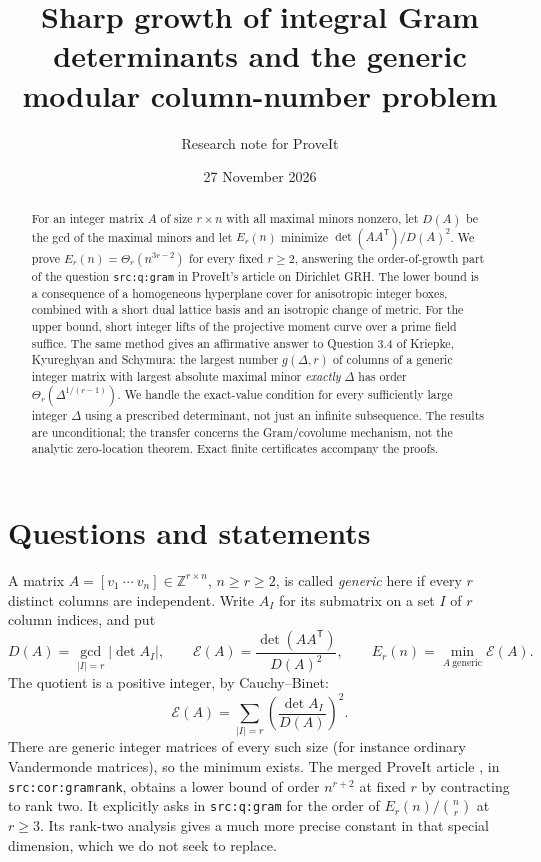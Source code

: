 \documentclass[11pt]{article}
\title{\textbf{Sharp growth of integral Gram determinants and the generic modular column-number problem}}
\author{Research note for ProveIt}
\date{27 November 2026}
\theoremstyle{remark}\newtheorem{remark}[theorem]{Remark}
\newcommand{\Z}{\mathbb Z}\newcommand{\R}{\mathbb R}\newcommand{\F}{\mathbb F}
\begin{document}
\maketitle
\begin{abstract}
For an integer matrix $A$ of size $r\times n$ with all maximal minors nonzero, let $D(A)$ be the gcd of the maximal minors and let $E_r(n)$ minimize $\det(AA^{\mathsf T})/D(A)^2$. We prove $E_r(n)=\Theta_r(n^{3r-2})$ for every fixed $r\ge2$, answering the order-of-growth part of the question \texttt{src:q:gram} in ProveIt's article on Dirichlet GRH. The lower bound is a consequence of a homogeneous hyperplane cover for anisotropic integer boxes, combined with a short dual lattice basis and an isotropic change of metric. For the upper bound, short integer lifts of the projective moment curve over a prime field suffice. The same method gives an affirmative answer to Question 3.4 of Kriepke, Kyureghyan and Schymura: the largest number $g(\Delta,r)$ of columns of a generic integer matrix with largest absolute maximal minor \emph{exactly} $\Delta$ has order $\Theta_r(\Delta^{1/(r-1)})$. We handle the exact-value condition for every sufficiently large integer $\Delta$ using a prescribed determinant, not just an infinite subsequence. The results are unconditional; the transfer concerns the Gram/covolume mechanism, not the analytic zero-location theorem. Exact finite certificates accompany the proofs.
\end{abstract}

\section{Questions and statements}
A matrix $A=[v_1\ \cdots\ v_n]\in\Z^{r\times n}$, $n\ge r\ge2$, is called \emph{generic} here if every $r$ distinct columns are independent. Write $A_I$ for its submatrix on a set $I$ of $r$ column indices, and put
\begin{equation}\label{eq:def}
 D(A)=\gcd_{|I|=r}|\det A_I|,\qquad
 \mathcal E(A)=\frac{\det(AA^{\mathsf T})}{D(A)^2},\qquad
 E_r(n)=\min_{A\ \mathrm{generic}}\mathcal E(A).
\end{equation}
The quotient is a positive integer, by Cauchy--Binet:
\begin{equation}\label{eq:CB}
 \mathcal E(A)=\sum_{|I|=r}\left(\frac{\det A_I}{D(A)}\right)^2.
\end{equation}
There are generic integer matrices of every such size (for instance ordinary Vandermonde matrices), so the minimum exists. The merged ProveIt article \cite{proveit}, in \texttt{src:cor:gramrank}, obtains a lower bound of order $n^{r+2}$ at fixed $r$ by contracting to rank two. It explicitly asks in \texttt{src:q:gram} for the order of $E_r(n)/\binom nr$ at $r\ge3$. Its rank-two analysis gives a much more precise constant in that special dimension, which we do not seek to replace.
\end{document}

